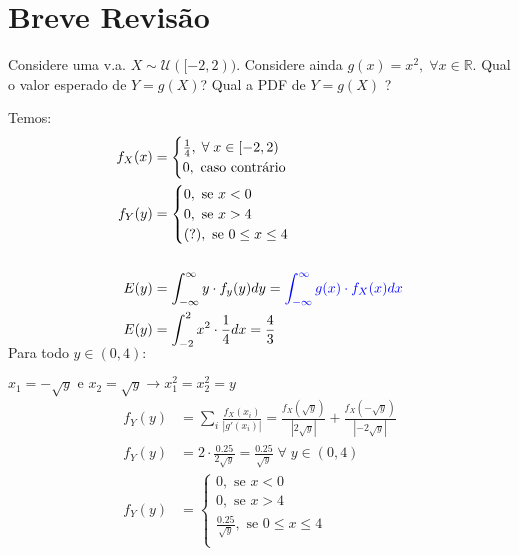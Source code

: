 \documentclass{article}
\makeatletter
\newcommand{\bb}[1]{\mathbb{#1}}
\def\mcolor#1#{\@mcolor{#1}}
\def\@mcolor#1#2#3{%
  \protect\leavevmode
  \begingroup
    \color#1{#2}#3%
  \endgroup
}
\makeatother
\begin{document}
\setlength{\abovedisplayskip}{12pt}
\setlength{\belowdisplayskip}{12pt}
\setlength{\abovedisplayshortskip}{0pt}
\setlength{\belowdisplayshortskip}{0pt}
\setlength{\jot}{1pt}

\section{Breve Revisão}
Considere uma v.a. $X \sim \mathscr{U}([-2,2))$. Considere ainda $g(x) = x^2, \; \forall x \in
\bb{R}$. Qual o valor esperado de $Y = g(X)$? Qual a PDF de $Y = g(X)$ ?

Temos:
\begin{align*}
    f_X(x)&=
        \begin{cases}
            \frac{1}{4}, \; \forall \; x \in [-2,2) \\
            0, \text{ caso contrário}
        \end{cases}
        \\
    f_Y(y)&=
        \begin{cases}
            0, \text{ se } x < 0 \\
            0, \text{ se } x > 4 \\
            \text{(?)}, \text{ se } 0 \leq x \leq 4 \\
        \end{cases}
        \\ \\
    E(y) &= \int^\infty_{-\infty} y \cdot f_y(y)dy = \mcolor{blue}{\int^\infty_{-\infty} g(x) \cdot
    f_X(x)dx} \\
        E(y) &= \int^2_{-2} x^2 \cdot \frac{1}{4} dx = \frac{4}{3} \\[-1em]
\end{align*}
Para todo $y \in (0,4)$:

$x_1 = - \sqrt{y} \text{ e } x_2 = \sqrt{y} \rightarrow x_1^2 = x_2^2 = y$
\begin{align*}
    f_Y(y) &= \sum_i \frac{f_X(x_i)}{|g'(x_i)|} = \frac{f_X(\sqrt{y})}{|2\sqrt{y}|} +
    \frac{f_X(-\sqrt{y})}{|-2\sqrt{y}|}\\
    f_Y(y) &= 2 \cdot \frac{0.25}{2\sqrt{y}} = \frac{0.25}{\sqrt{y}} \; \forall \; y \in (0,4) \\
    f_Y(y)&=
    \begin{cases}
        0, \text{ se } x < 0 \\
        0, \text{ se } x > 4 \\
        \frac{0.25}{\sqrt{y}}, \text{ se } 0 \leq x \leq 4 \\
    \end{cases}
\end{align*}
\\[-0.75em]
\end{document}
